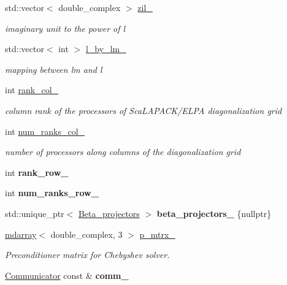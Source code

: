 \begin{DoxyCompactItemize}
std\+::vector$<$ double\+\_\+complex $>$ \hyperlink{classsirius_1_1_k__point_a63bb5c2fb436b8292cfc9215f488b44a}{zil\+\_\+}
\begin{DoxyCompactList}\small\item\em imaginary unit to the power of l \end{DoxyCompactList}\item 
std\+::vector$<$ int $>$ \hyperlink{classsirius_1_1_k__point_afcd70ca076b5714dfbc9ceb8503299b6}{l\+\_\+by\+\_\+lm\+\_\+}
\begin{DoxyCompactList}\small\item\em mapping between lm and l \end{DoxyCompactList}\item 
int \hyperlink{classsirius_1_1_k__point_aa10c7539cc86b6a36c2b17b593fc6ad3}{rank\+\_\+col\+\_\+}
\begin{DoxyCompactList}\small\item\em column rank of the processors of Sca\+L\+A\+P\+A\+C\+K/\+E\+L\+P\+A diagonalization grid \end{DoxyCompactList}\item 
int \hyperlink{classsirius_1_1_k__point_ab03535344a72df246d0832000093ad2e}{num\+\_\+ranks\+\_\+col\+\_\+}
\begin{DoxyCompactList}\small\item\em number of processors along columns of the diagonalization grid \end{DoxyCompactList}\item 
\hypertarget{classsirius_1_1_k__point_a80db0ddb16002fa90181cc0c9e3c3d6d}{}int {\bfseries rank\+\_\+row\+\_\+}\label{classsirius_1_1_k__point_a80db0ddb16002fa90181cc0c9e3c3d6d}

\item 
\hypertarget{classsirius_1_1_k__point_a6d22d73298126cecf5853a03da603f09}{}int {\bfseries num\+\_\+ranks\+\_\+row\+\_\+}\label{classsirius_1_1_k__point_a6d22d73298126cecf5853a03da603f09}

\item 
\hypertarget{classsirius_1_1_k__point_abb6dba38892449f97e915ec6a15892ed}{}std\+::unique\+\_\+ptr$<$ \hyperlink{classsirius_1_1_beta__projectors}{Beta\+\_\+projectors} $>$ {\bfseries beta\+\_\+projectors\+\_\+} \{nullptr\}\label{classsirius_1_1_k__point_abb6dba38892449f97e915ec6a15892ed}

\item 
\hyperlink{classsddk_1_1mdarray}{mdarray}$<$ double\+\_\+complex, 3 $>$ \hyperlink{classsirius_1_1_k__point_a2efb48aea899a01b6f2fd7ae295bb556}{p\+\_\+mtrx\+\_\+}
\begin{DoxyCompactList}\small\item\em Preconditioner matrix for Chebyshev solver. \end{DoxyCompactList}\item 
\hypertarget{classsirius_1_1_k__point_ac8af73845774dc69c34d8feeb36fb27b}{}\hyperlink{classsddk_1_1_communicator}{Communicator} const \& {\bfseries comm\+\_\+}\label{classsirius_1_1_k__point_ac8af73845774dc69c34d8feeb36fb27b}


\end{DoxyCompactItemize}
